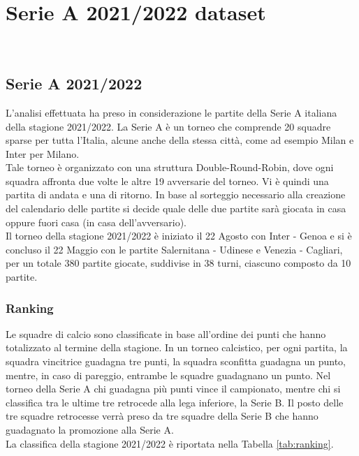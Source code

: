 
\chapter{Serie A 2021/2022 dataset }
\label{cap:dataset}

\\

\section{Serie A 2021/2022}

L'analisi effettuata ha preso in considerazione le partite della Serie A italiana della stagione 2021/2022. La Serie A è un torneo che comprende 20 squadre sparse per tutta l'Italia, alcune anche della stessa città, come ad esempio Milan e Inter per Milano. \\
Tale torneo è organizzato con una struttura Double-Round-Robin, dove ogni squadra affronta due volte le altre 19 avversarie del torneo. Vi è quindi una partita di andata e una di ritorno. In base al sorteggio necessario alla creazione del calendario delle partite si decide quale delle due partite sarà giocata in casa oppure fuori casa (in casa dell'avversario). \\
Il torneo della stagione 2021/2022 è iniziato il 22 Agosto con Inter - Genoa e si è concluso il 22 Maggio con le partite Salernitana - Udinese e Venezia - Cagliari, per un totale 380 partite giocate, suddivise in 38 turni, ciascuno composto da 10 partite.

\subsection{Ranking}
Le squadre di calcio sono classificate in base all'ordine dei punti che hanno totalizzato al termine della stagione. In un torneo calcistico, per ogni partita, la squadra vincitrice guadagna tre punti, la squadra sconfitta guadagna un punto, mentre, in caso di pareggio, entrambe le squadre guadagnano un punto. Nel torneo della Serie A chi guadagna più punti vince il campionato, mentre chi si classifica tra le ultime tre retrocede alla lega inferiore, la Serie B. Il posto delle tre squadre retrocesse verrà preso da tre squadre della Serie B che hanno guadagnato la promozione alla Serie A.\\ 
La classifica della stagione 2021/2022 è riportata nella Tabella \ref{tab:ranking}.

